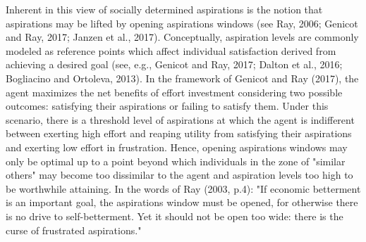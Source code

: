 \documentclass[11.5pt]{article}
\begin{document}
{Inherent in this view of socially determined aspirations is the notion that aspirations may be lifted by opening aspirations windows (see Ray, 2006; Genicot and Ray, 2017; Janzen et al., 2017). Conceptually, aspiration levels are commonly modeled as reference points which affect individual satisfaction derived from achieving a desired goal (see, e.g., Genicot and Ray, 2017; Dalton et al., 2016; Bogliacino and Ortoleva, 2013). In the framework of Genicot and Ray (2017), the agent maximizes the net benefits of effort investment considering two possible outcomes: satisfying their aspirations or failing to satisfy them. Under this scenario, there is a threshold level of aspirations at which the agent is indifferent between exerting high effort and reaping utility from satisfying their aspirations and exerting low effort in frustration. Hence, opening aspirations windows may only be optimal up to a point beyond which individuals in the zone of "similar others" may become too dissimilar to the agent and aspiration levels too high to be worthwhile attaining. In the words of Ray (2003, p.4): "If economic betterment is an important goal, the aspirations window must be opened, for otherwise there is no drive to self-betterment. Yet it should not be open too wide: there is the curse of frustrated aspirations."

}
\end{document}
